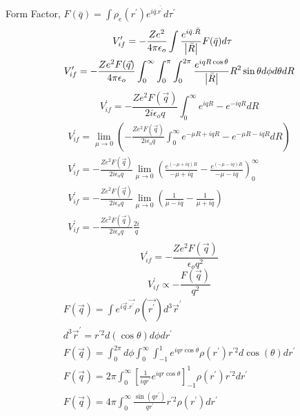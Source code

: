 \documentclass[11pt, a4paper]{article}
\begin{document}
Form Factor, \(F(\bar{q}) = \int \rho_e(r^\prime)e^{i \bar{q}.\bar{r^\prime }}d\tau^\prime\) 
\begin{gather}
    V_{if}^\prime = -\frac{Ze^2}{4 \pi \epsilon_{o}} \int \frac{e^{i\bar{q}.\bar{R}}}{\left\vert \bar{R} \right\vert}F(\bar{q})d\tau \hspace{.5cm}\\
    V_{if}^\prime =  -\frac{Ze^2 F(\vec{q})}{4 \pi \epsilon_{o}} \int_{0} ^ {\infty}  \int_{0}^{\pi} \int_{0}^{2 \pi} \frac{e^{i q R \cos \theta}}{\left\vert \bar{R} \right\vert }R^2 \sin \theta d\phi d\theta dR 
\end{gather}
\begin{equation}
    \boxed{V_{if}^\prime =  -\frac{Ze^2 F(\vec{q})}{2 i \epsilon_{o}q} \int_0^{\infty} e^{i q R} - e^{-i q R} dR}
\end{equation}
\begin{gather}
    V_{if}^{\prime}  = \lim\limits_{\mu \to 0} \left( -\frac{Ze^2 F(\vec{q})}{2 i \epsilon_{o}q} \int_0^{\infty} e^{-\mu R +i q R} - e^{-\mu R -i q R} dR \right)\\
    V_{if}^\prime  = -\frac{Ze^2 F(\vec{q})}{2 i \epsilon_{o}q}  \lim\limits_{\mu \to 0} \left(\frac{e^{(-\mu+iq)R}}{-\mu + iq}-\frac{e^{(-\mu-iq)R}}{-\mu - iq} \right)_0^{\infty} \\
    V_{if}^\prime  = -\frac{Ze^2 F(\vec{q})}{2 i \epsilon_{o}q} \lim\limits_{\mu \to 0}  \left( \frac{1}{\mu-iq}-\frac{1}{\mu+iq}\right)\\
    V_{if}^\prime =  -\frac{Ze^2 F(\vec{q})}{2 i \epsilon_{o}q} \frac{2i}{q}\\
\end{gather}
\begin{equation}
    \boxed{V_{if}^\prime = -\frac{Ze^2 F(\vec{q})}{\epsilon_{o}q^2} }
\end{equation}
\begin{equation}
    \boxed {V_{if}^\prime \propto -\frac{F(\vec{q})}{q^2}}
\end{equation}
\begin{gather}
    F(\vec{q}) = \int e^{i \vec{q}.\vec{r^\prime }}\rho(\vec{r^\prime })d^3\vec{r}^\prime \\
    d^3 \vec{r}^\prime  = r^{\prime 2} d(\cos \theta)d\phi dr^\prime \\
    F(\vec{q}) = \int _0 ^{2\pi} d\phi \int_0^{\infty} \int_{-1}^{1} e^{iqr\cos \theta}\rho(r^\prime)r^{\prime 2} d \cos (\theta) dr^\prime \\
    F(\vec{q}) = 2\pi \int_0^{\infty} \left[\frac{1}{iqr^\prime }e^{iqr\cos \theta}\right]_{-1}^{1} \rho(r^\prime )r^{\prime 2} dr^\prime\\
    F(\vec{q}) = 4 \pi  \int_0^{\infty} \frac{\sin (qr^\prime )}{q r^\prime } r^{\prime 2}\rho(r^\prime )dr^\prime 
\end{gather}
\end{document}
